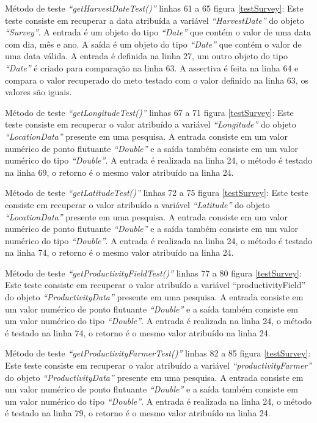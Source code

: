Método de teste \textit{“getHarvestDateTest()”} linhas 61 a 65 figura \ref{testSurvey}: Este teste consiste em recuperar a data atribuída a variável \textit{“HarvestDate”} do objeto \textit{“Survey”}. A entrada é um objeto do tipo \textit{“Date”} que contém o valor de uma data com dia, mês e ano. A saída é um objeto do tipo \textit{“Date”} que contém o valor de uma data válida. A entrada é definida na linha 27, um outro objeto do tipo \textit{“Date”} é criado para comparação na linha 63. A assertiva é feita na linha 64 e compara o valor recuperado do meto testado com o valor definido na linha 63, os valores são iguais.  

Método de teste \textit{“getLongitudeTest()”} linhas 67 a 71 figura \ref{testSurvey}: Este teste consiste em recuperar o valor atribuído a variável \textit{“Longitude” }do objeto \textit{“LocationData”}  presente em uma pesquisa. A entrada consiste em um valor numérico de ponto flutuante \textit{“Double”} e a saída também consiste em um valor numérico do tipo \textit{“Double”}. A entrada é realizada na linha 24, o método é testado na linha 69, o retorno é o mesmo valor atribuído na linha 24.   

Método de teste \textit{“getLatitudeTest()”} linhas 72 a 75 figura \ref{testSurvey}: Este teste consiste em recuperar o valor atribuído a variável\textit{ “Latitude”} do objeto \textit{“LocationData”} presente em uma pesquisa. A entrada consiste em um valor numérico de ponto flutuante \textit{“Double”} e a saída também consiste em um valor numérico do tipo \textit{“Double”}. A entrada é realizada na linha 24, o método é testado na linha 74, o retorno é o mesmo valor atribuído na linha 24.

Método de teste \textit{“getProductivityFieldTest()”} linhas 77 a 80 figura \ref{testSurvey}: Este teste consiste em recuperar o valor atribuído a variável “productivityField” do objeto \textit{“ProductivityData”} presente em uma pesquisa. A entrada consiste em um valor numérico de ponto flutuante \textit{“Double”} e a saída também consiste em um valor numérico do tipo \textit{“Double”}. A entrada é realizada na linha 24, o método é testado na linha 74, o retorno é o mesmo valor atribuído na linha 24.

Método de teste \textit{“getProductivityFarmerTest()”} linhas 82 a 85 figura \ref{testSurvey}: Este teste consiste em recuperar o valor atribuído a variável\textit{ “productivityFarmer”} do objeto \textit{“ProductivityData”} presente em uma pesquisa. A entrada consiste em um valor numérico de ponto flutuante \textit{“Double”} e a saída também consiste em um valor numérico do tipo \textit{“Double”}. A entrada é realizada na linha 24, o método é testado na linha 79, o retorno é o mesmo valor atribuído na linha 24.

